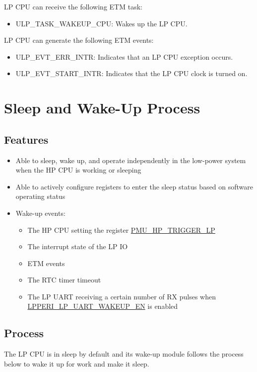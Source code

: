\documentclass[main\_\_EN.tex]{subfiles}
\begin{document}
LP CPU can receive the following ETM task:

\begin{itemize}
    \item ULP\_TASK\_WAKEUP\_CPU: Wakes up the LP CPU.
\end{itemize}

LP CPU can generate the following ETM events:

\begin{itemize}
    \item ULP\_EVT\_ERR\_INTR: Indicates that an LP CPU exception occurs.
    \item ULP\_EVT\_START\_INTR: Indicates that the LP CPU clock is turned on.
\end{itemize}


\section{Sleep and Wake-Up Process}\label{sec:sleep}
\subsection{Features}
\begin{itemize}
    \item Able to sleep, wake up, and operate independently in the low-power system when the HP CPU is working or sleeping
    \item Able to actively configure registers to enter the sleep status based on software operating status
    \item Wake-up events:
    \begin{itemize}
        \item The HP CPU setting the register \hyperref[fielddesc:PMUHPTRIGGERLP]{PMU\_HP\_TRIGGER\_LP}
        \item The interrupt state of the LP IO
        \item ETM events
        \item The RTC timer timeout
        \item The LP UART receiving a certain number of RX pulses when \hyperref[fielddesc:LPPERILPUARTWAKEUPEN]{LPPERI\_LP\_UART\_WAKEUP\_EN} is enabled
   \end{itemize}
\end{itemize}

\subsection{Process}
The LP CPU is in sleep by default and its wake-up module follows the process below to wake it up for work and make it sleep.
\end{document}
